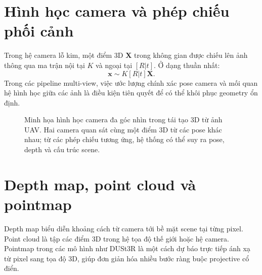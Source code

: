 \documentclass[../DoAn.tex]{subfiles}
\begin{document}
\section{Hình học camera và phép chiếu phối cảnh}

Trong hệ camera lỗ kim, một điểm 3D $\mathbf{X}$ trong không gian được chiếu lên ảnh thông qua ma trận nội tại $K$ và ngoại tại $[R|t]$. Ở dạng thuần nhất:
\[
\mathbf{x} \sim K [R|t] \mathbf{X}.
\]
Trong các pipeline multi-view, việc ước lượng chính xác pose camera và mối quan hệ hình học giữa các ảnh là điều kiện tiên quyết để có thể khôi phục geometry ổn định.

\begin{figure}[H]
\centering
{}
\caption{Minh họa hình học camera đa góc nhìn trong tái tạo 3D từ ảnh UAV. Hai camera quan sát cùng một điểm 3D từ các pose khác nhau; từ các phép chiếu tương ứng, hệ thống có thể suy ra pose, depth và cấu trúc scene.}
\label{fig:multi-view-geometry}
\end{figure}

\section{Depth map, point cloud và pointmap}

Depth map biểu diễn khoảng cách từ camera tới bề mặt scene tại từng pixel. Point cloud là tập các điểm 3D trong hệ tọa độ thế giới hoặc hệ camera. Pointmap trong các mô hình như DUSt3R là một cách dự báo trực tiếp ánh xạ từ pixel sang tọa độ 3D, giúp đơn giản hóa nhiều bước ràng buộc projective cổ điển.
\end{document}
